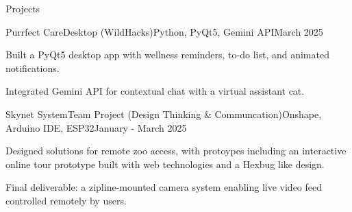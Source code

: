 \documentclass[
    a4paper,
    9pt,
]{resume}
\begin{document}

\begin{rSection}{Projects}

	\begin{rSubsection}{Purrfect Care}{Desktop (WildHacks)}{Python, PyQt5, Gemini API}{March 2025}{}
		\item Built a PyQt5 desktop app with wellness reminders, to-do list, and animated notifications.
  		\item Integrated Gemini API for contextual chat with a virtual assistant cat.
	  \end{rSubsection}



\begin{rSubsection}{Skynet System}{Team Project (Design Thinking \& Communcation)}{Onshape, Arduino IDE, ESP32}{January - March 2025}
	  \item Designed solutions for remote zoo access, with protoypes including an interactive online tour prototype built with web technologies and a Hexbug like design.
  	\item Final deliverable: a zipline-mounted camera system enabling live video feed controlled remotely by users.
    \end{rSubsection}
    
  \end{rSection}

%



\end{document}
